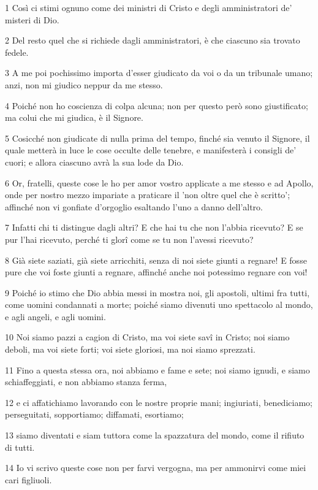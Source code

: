 \par 1 Così ci stimi ognuno come dei ministri di Cristo e degli amministratori de' misteri di Dio.
\par 2 Del resto quel che si richiede dagli amministratori, è che ciascuno sia trovato fedele.
\par 3 A me poi pochissimo importa d'esser giudicato da voi o da un tribunale umano; anzi, non mi giudico neppur da me stesso.
\par 4 Poiché non ho coscienza di colpa alcuna; non per questo però sono giustificato; ma colui che mi giudica, è il Signore.
\par 5 Cosicché non giudicate di nulla prima del tempo, finché sia venuto il Signore, il quale metterà in luce le cose occulte delle tenebre, e manifesterà i consigli de' cuori; e allora ciascuno avrà la sua lode da Dio.
\par 6 Or, fratelli, queste cose le ho per amor vostro applicate a me stesso e ad Apollo, onde per nostro mezzo impariate a praticare il 'non oltre quel che è scritto'; affinché non vi gonfiate d'orgoglio esaltando l'uno a danno dell'altro.
\par 7 Infatti chi ti distingue dagli altri? E che hai tu che non l'abbia ricevuto? E se pur l'hai ricevuto, perché ti glorî come se tu non l'avessi ricevuto?
\par 8 Già siete saziati, già siete arricchiti, senza di noi siete giunti a regnare! E fosse pure che voi foste giunti a regnare, affinché anche noi potessimo regnare con voi!
\par 9 Poiché io stimo che Dio abbia messi in mostra noi, gli apostoli, ultimi fra tutti, come uomini condannati a morte; poiché siamo divenuti uno spettacolo al mondo, e agli angeli, e agli uomini.
\par 10 Noi siamo pazzi a cagion di Cristo, ma voi siete savî in Cristo; noi siamo deboli, ma voi siete forti; voi siete gloriosi, ma noi siamo sprezzati.
\par 11 Fino a questa stessa ora, noi abbiamo e fame e sete; noi siamo ignudi, e siamo schiaffeggiati, e non abbiamo stanza ferma,
\par 12 e ci affatichiamo lavorando con le nostre proprie mani; ingiuriati, benediciamo; perseguitati, sopportiamo; diffamati, esortiamo;
\par 13 siamo diventati e siam tuttora come la spazzatura del mondo, come il rifiuto di tutti.
\par 14 Io vi scrivo queste cose non per farvi vergogna, ma per ammonirvi come miei cari figliuoli.
